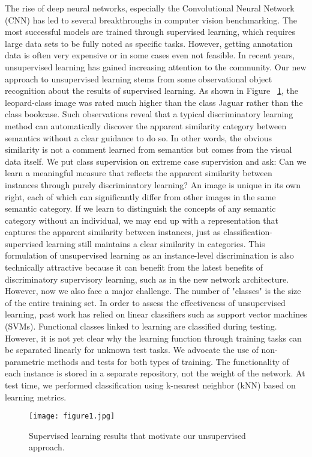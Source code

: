 \documentclass[a4paper,18pt]{article}
\begin{document}
 The rise of deep neural networks, especially the Convolutional Neural Network (CNN) has led to several breakthroughs in computer vision benchmarking. The most successful models are trained through supervised learning, which requires large data sets to be fully noted as specific tasks. However, getting annotation data is often very expensive or in some cases even not feasible. In recent years, unsupervised learning has gained increasing attention to the community\cite{Doersch_2015_Unsupervised}. Our new approach to unsupervised learning stems from some observational object recognition about the results of supervised learning. As shown in Figure ~\ref{pic1}, the leopard-class image was rated much higher than the class Jaguar rather than the class bookcase. Such observations reveal that a typical discriminatory learning method can automatically discover the apparent similarity category between semantics without a clear guidance to do so. In other words, the obvious similarity is not a comment learned from semantics but comes from the visual data itself. We put class supervision on extreme case supervision and ask: Can we learn a meaningful measure that reflects the apparent similarity between instances through purely discriminatory learning? An image is unique in its own right, each of which can significantly differ from other images in the same semantic category. If we learn to distinguish the concepts of any semantic category without an individual, we may end up with a representation that captures the apparent similarity between instances, just as classification-supervised learning still maintains a clear similarity in categories. This formulation of unsupervised learning as an instance-level discrimination is also technically attractive because it can benefit from the latest benefits of discriminatory supervisory learning, such as in the new network architecture. However, now we also face a major challenge. The number of "classes" is the size of the entire training set. In order to assess the effectiveness of unsupervised learning, past work has relied on linear classifiers such as support vector machines (SVMs). Functional classes linked to learning are classified during testing. However, it is not yet clear why the learning function through training tasks can be separated linearly for unknown test tasks. We advocate the use of non-parametric methods and tests for both types of training. The functionality of each instance is stored in a separate repository, not the weight of the network. At test time, we performed classification using k-nearest neighbor (kNN) based on learning metrics.
 \begin{figure}[htp]
 	\centering
 	\texttt{[image: figure1.jpg]}
 	\caption{ Supervised learning results that motivate our unsupervised
 			approach. 
 }\label{pic1}
 \end{figure}
\end{document}
